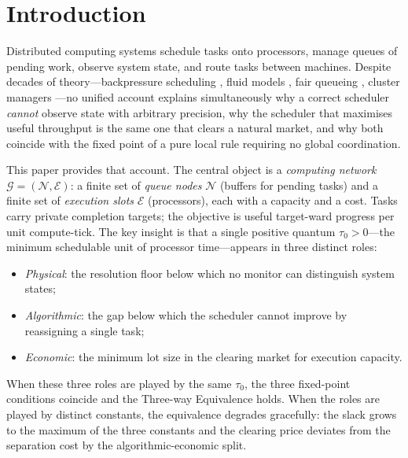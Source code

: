 \documentclass[11pt,twocolumn,a4paper]{article}
\theoremstyle{plain}
\theoremstyle{definition}
\theoremstyle{remark}
\newcommand{\N}{\mathcal{N}}
\newcommand{\E}{\mathcal{E}}
\newcommand{\G}{\mathcal{G}}
\newcommand{\tick}{\tau_0}
\begin{document}
\tableofcontents

\section{Introduction}
\label{sec:intro}

Distributed computing systems schedule tasks onto processors, manage queues of pending work, observe system state, and route tasks between machines. Despite decades of theory---backpressure scheduling \cite{tassiulas1992}, fluid models \cite{neely2010}, fair queueing \cite{demers1990}, cluster managers \cite{hindman2011,verma2015}---no unified account explains simultaneously why a correct scheduler \emph{cannot} observe state with arbitrary precision, why the scheduler that maximises useful throughput is the same one that clears a natural market, and why both coincide with the fixed point of a pure local rule requiring no global coordination.

This paper provides that account. The central object is a \emph{computing network} $\G = (\N, \E)$: a finite set of \emph{queue nodes} $\N$ (buffers for pending tasks) and a finite set of \emph{execution slots} $\E$ (processors), each with a capacity and a cost. Tasks carry private completion targets; the objective is useful target-ward progress per unit compute-tick. The key insight is that a single positive quantum $\tick > 0$---the minimum schedulable unit of processor time---appears in three distinct roles:
\begin{itemize}[nosep]
\item \emph{Physical}: the resolution floor below which no monitor can distinguish system states;
\item \emph{Algorithmic}: the gap below which the scheduler cannot improve by reassigning a single task;
\item \emph{Economic}: the minimum lot size in the clearing market for execution capacity.
\end{itemize}

When these three roles are played by the same $\tick$, the three fixed-point conditions coincide and the Three-way Equivalence holds. When the roles are played by distinct constants, the equivalence degrades gracefully: the slack grows to the maximum of the three constants and the clearing price deviates from the separation cost by the algorithmic-economic split.
\end{document}
